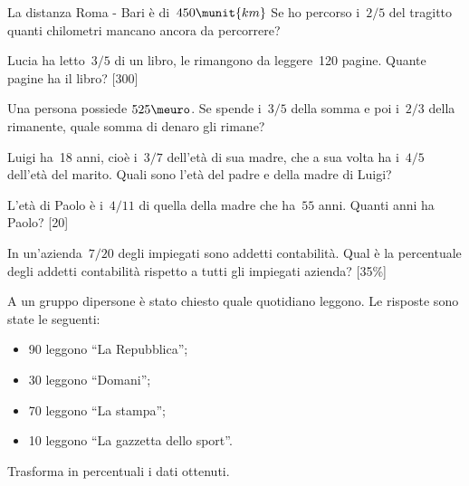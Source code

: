 \begin{htmulticols}{2}

\begin{esercizio}
 \label{ese:3.75}
La distanza Roma - Bari è di~\(450\munit{km}\) Se ho percorso i~\(2/5\) del 
tragitto quanti chilometri
mancano ancora da percorrere?
\end{esercizio}

\begin{esercizio}
 \label{ese:3.76}
Lucia ha letto~\(3/5\) di un libro, le rimangono da leggere~120 pagine. 
Quante pagine ha il libro? \hfill [300]
\end{esercizio}

\begin{esercizio}
 \label{ese:3.77}
Una persona possiede \(525\meuro\). Se spende i~\(3/5\) della somma e 
poi i~\(2/3\) della rimanente, quale somma di denaro gli rimane?
\end{esercizio}

\begin{esercizio}
 \label{ese:3.78}
Luigi ha~18 anni, cioè i~\(3/7\) dell'età di sua madre, che a sua volta ha 
i~\(4/5\) dell'età del marito. Quali sono l'età del padre e della madre di 
Luigi?
\end{esercizio}

\begin{esercizio}
L'età di Paolo è i~\(4/11\) di quella della madre che
ha~\(55\) anni. 
Quanti anni ha Paolo? \hfill [20]
\end{esercizio}

\begin{esercizio}
In un'azienda~\(7/20\) degli impiegati sono addetti contabilità.
Qual è la percentuale degli addetti contabilità
rispetto a tutti gli impiegati azienda? \hfill [35\%]
\end{esercizio}

\begin{esercizio}
A un gruppo dipersone è stato chiesto quale quotidiano
leggono. Le risposte sono state le seguenti:
\begin{itemize}[nosep]
\item 90 leggono ``La Repubblica'';
\item 30 leggono ``Domani'';
\item 70 leggono ``La stampa'';
\item 10 leggono ``La gazzetta dello sport''.
\end{itemize}
Trasforma in percentuali i dati ottenuti.\\
\end{esercizio}


\end{htmulticols}
